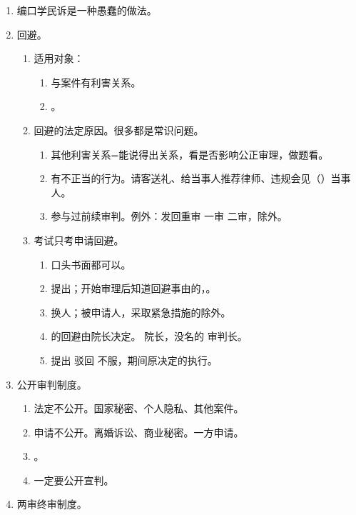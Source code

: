 \begin{enumerate}
\begin{enumerate}
          \item 督促程序=支付令 \yjt 独任制。
          \item 公示催告程序。公示催告阶段 \yjt 独任制；除权判决阶段 \yjt 合议制。
        \end{enumerate}
  \item 编口学民诉是一种愚蠢的做法。
  \item 回避。
        \begin{enumerate}
          \item 适用对象：
                \begin{enumerate}
                  \item 与案件有利害关系。
                  \item {}。
                \end{enumerate}
          \item 回避的法定原因。很多都是常识问题。
                \begin{enumerate}
                  \item 其他利害关系=能说得出关系，看是否影响公正审理，做题看。
                  \item 有不正当的行为。请客送礼、给当事人推荐律师、违规会见（）当事人。
                  \item 参与过前续审判。例外：发回重审 \yjt 一审 \yjt 二审，除外。
                \end{enumerate}
          \item 考试只考申请回避。
                \begin{enumerate}
                  \item 口头书面都可以。
                  \item {}提出；开始审理后知道回避事由的，。
                  \item 换人；被申请人，采取紧急措施的除外。
                  \item {}的回避由院长决定。 \yjt 院长，没名的 \yjt 审判长。
                  \item 提出 \yjt 驳回 \yjt 不服，期间原决定的执行。
                \end{enumerate}
        \end{enumerate}
  \item 公开审判制度。
        \begin{enumerate}
          \item 法定不公开。国家秘密、个人隐私、其他案件。
          \item 申请不公开。离婚诉讼、商业秘密。一方申请。
          \item {}。
          \item {}一定要公开宣判。
        \end{enumerate}
  \item 两审终审制度。
\end{enumerate}
